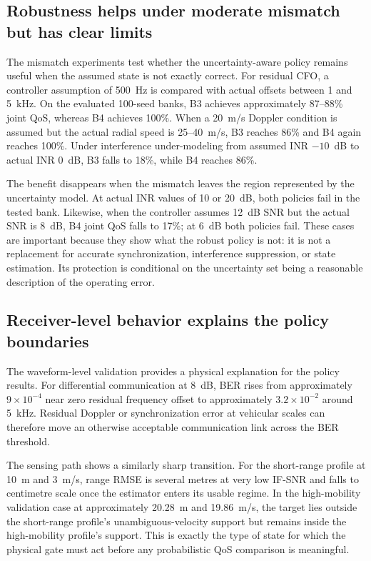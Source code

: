 \subsection{Robustness helps under moderate mismatch but has clear limits}

The mismatch experiments test whether the uncertainty-aware policy remains useful when the assumed state is not exactly correct. For residual CFO, a controller assumption of 500~Hz is compared with actual offsets between 1 and 5~kHz. On the evaluated 100-seed banks, B3 achieves approximately 87--88\% joint QoS, whereas B4 achieves 100\%. When a 20~m/s Doppler condition is assumed but the actual radial speed is 25--40~m/s, B3 reaches 86\% and B4 again reaches 100\%. Under interference under-modeling from assumed INR $-10$~dB to actual INR 0~dB, B3 falls to 18\%, while B4 reaches 86\%.

The benefit disappears when the mismatch leaves the region represented by the uncertainty model. At actual INR values of 10 or 20~dB, both policies fail in the tested bank. Likewise, when the controller assumes 12~dB SNR but the actual SNR is 8~dB, B4 joint QoS falls to 17\%; at 6~dB both policies fail. These cases are important because they show what the robust policy is not: it is not a replacement for accurate synchronization, interference suppression, or state estimation. Its protection is conditional on the uncertainty set being a reasonable description of the operating error.

\subsection{Receiver-level behavior explains the policy boundaries}

The waveform-level validation provides a physical explanation for the policy results. For differential communication at 8~dB, BER rises from approximately $9\times10^{-4}$ near zero residual frequency offset to approximately $3.2\times10^{-2}$ around 5~kHz. Residual Doppler or synchronization error at vehicular scales can therefore move an otherwise acceptable communication link across the BER threshold.

The sensing path shows a similarly sharp transition. For the short-range profile at 10~m and 3~m/s, range RMSE is several metres at very low IF-SNR and falls to centimetre scale once the estimator enters its usable regime. In the high-mobility validation case at approximately 20.28~m and 19.86~m/s, the target lies outside the short-range profile's unambiguous-velocity support but remains inside the high-mobility profile's support. This is exactly the type of state for which the physical gate must act before any probabilistic QoS comparison is meaningful.

